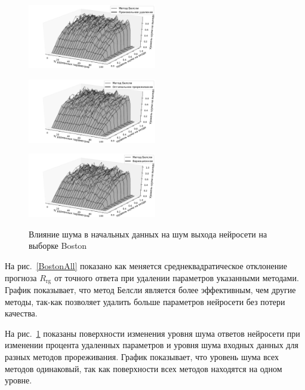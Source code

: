 \begin{figure}[h!t]\center
\begin{minipage}[t]{.5\textwidth}
{\includegraphics[width=0.5\textwidth]{plots/grabovoy/Boston/RandomNoise3D.pdf}}
\end{minipage}
\begin{minipage}[t]{.5\textwidth}
{\includegraphics[width=0.5\textwidth]{plots/grabovoy/Boston/OBDNoise3D.pdf}}
\end{minipage}

\begin{minipage}[t]{.5\textwidth}
{\includegraphics[width=0.5\textwidth]{plots/grabovoy/Boston/VariationalNoise3D.pdf}}
\end{minipage}

\caption{Влияние шума в начальных данных на шум выхода нейросети на выборке Boston}
\label{BostonNoise}
\end{figure}


На рис.~\ref{BostonAll} показано как меняется среднеквадратическое отклонение прогноза $R_{\text{rg}}$ от точного ответа  при удалении параметров указанными методами. График показывает, что метод Белсли является более эффективным, чем другие методы, так-как позволяет удалить больше параметров нейросети без потери качества.

На рис.~\ref{BostonNoise} показаны поверхности изменения уровня шума ответов нейросети при изменении процента удаленных параметров и уровня шума входных данных для разных методов прореживания. График показывает, что уровень шума всех методов одинаковый, так как поверхности всех методов находятся на одном уровне.


